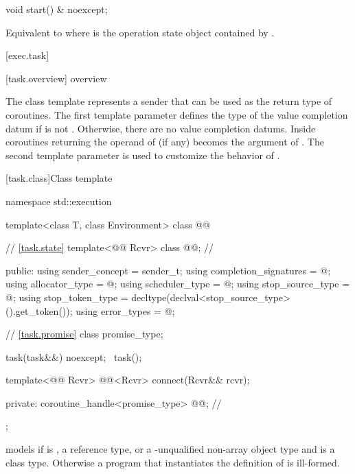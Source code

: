 %
\begin{itemdecl}
void start() & noexcept;
\end{itemdecl}
\begin{itemdescr}
\pnum
\effects
Equivalent to  where  is the operation
state object contained by .
\end{itemdescr}

[exec.task]{}

[task.overview]{ overview}

\pnum
The  class template represents a sender that can
be used as the return type of coroutines.
The first template parameter  defines the type of the value
completion datum if  is not .
Otherwise, there are no value completion datums.
Inside coroutines returning  the operand of
 (if any) becomes the argument of .
The second template parameter  is used to customize
the behavior of .

[task.class]{Class template }

\begin{codeblock}
namespace std::execution {
  template<class T, class Environment>
  class @@ {
    // \ref{task.state}
    template<@@ Rcvr>
      class @@;                              // \expos

  public:
    using sender_concept = sender_t;
    using completion_signatures = @\seebelow@;
    using allocator_type = @\seebelow@;
    using scheduler_type = @\seebelow@;
    using stop_source_type = @\seebelow@;
    using stop_token_type = decltype(declval<stop_source_type>().get_token());
    using error_types = @\seebelow@;

    // \ref{task.promise}
    class promise_type;

    task(task&&) noexcept;
    ~task();

    template<@@ Rcvr>
      @@<Rcvr> connect(Rcvr&& rcvr);

  private:
    coroutine_handle<promise_type> @@;      // \expos
  };
}
\end{codeblock}

\pnum
{} models 
if  is , a reference type, or a \cv{}-unqualified
non-array object type and  is a class type.
Otherwise a program that instantiates the definition of 
is ill-formed.

